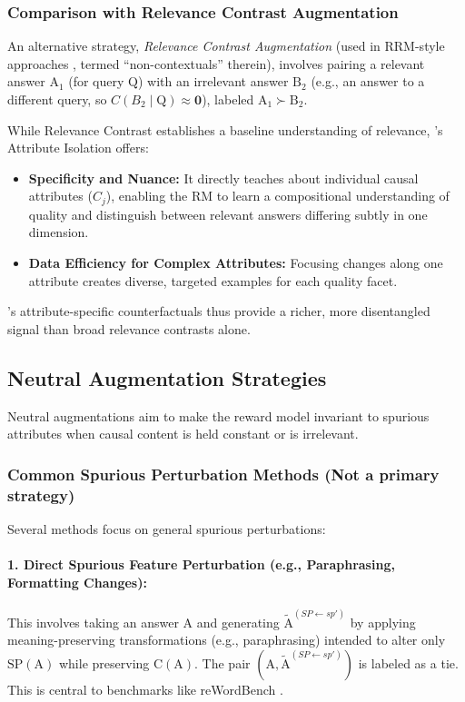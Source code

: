 \subsubsection{Comparison with Relevance Contrast Augmentation}
An alternative strategy, \textit{Relevance Contrast Augmentation} (used in RRM-style approaches \citep{liu2024rrm}, termed ``non-contextuals'' therein), involves pairing a relevant answer $\mathrm{A}_1$ (for query $\mathrm{Q}$) with an irrelevant answer $\mathrm{B}_2$ (e.g., an answer to a different query, so $C(B_2 \mid \mathrm{Q}) \approx \mathbf{0}$), labeled $\mathrm{A}_1 \succ \mathrm{B}_2$.

While Relevance Contrast establishes a baseline understanding of relevance, \carma{}'s Attribute Isolation offers:
\begin{itemize}[itemsep=0pt,left=8pt]
    \item \textbf{Specificity and Nuance:} It directly teaches about individual causal attributes ($C_j$), enabling the RM to learn a compositional understanding of quality and distinguish between relevant answers differing subtly in one dimension.
    \item \textbf{Data Efficiency for Complex Attributes:} Focusing changes along one attribute creates diverse, targeted examples for each quality facet.
\end{itemize}
\carma{}'s attribute-specific counterfactuals thus provide a richer, more disentangled signal than broad relevance contrasts alone.

\subsection{Neutral Augmentation Strategies}
Neutral augmentations aim to make the reward model invariant to spurious attributes when causal content is held constant or is irrelevant.

\subsubsection{Common Spurious Perturbation Methods (Not a primary \carma{} strategy)}
Several methods focus on general spurious perturbations:
\paragraph{1. Direct Spurious Feature Perturbation (e.g., Paraphrasing, Formatting Changes):}
This involves taking an answer $\mathrm{A}$ and generating $\tilde{\mathrm{A}}^{(SP \leftarrow sp')}$ by applying meaning-preserving transformations (e.g., paraphrasing) intended to alter only $\mathrm{SP}(\mathrm{A})$ while preserving $\mathrm{C}(\mathrm{A})$. The pair $(\mathrm{A}, \tilde{\mathrm{A}}^{(SP \leftarrow sp')})$ is labeled as a tie. This is central to benchmarks like reWordBench \citep{wu2025rewordbench}.

